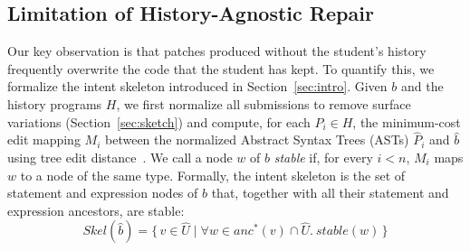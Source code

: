\documentclass[10pt,conference]{IEEEtran}
\begin{document}
\subsection{Limitation of History-Agnostic Repair}\label{sec:prelim-limit}

Our key observation is that patches produced without the student's history frequently overwrite the code that the student has kept. To quantify this, we formalize the intent skeleton introduced in Section~\ref{sec:intro}. Given $b$ and the history programs $H$, we first normalize all submissions to remove surface variations (Section~\ref{sec:sketch}) and compute, for each $P_i \in H$, the minimum-cost edit mapping $M_i$ between the normalized Abstract Syntax Trees (ASTs) $\hat{P}_i$ and $\hat{b}$ using tree edit distance~\cite{bille2005survey, pawlik2016tree}. We call a node $w$ of $\hat{b}$ \emph{stable} if, for every $i < n$, $M_i$ maps $w$ to a node of the same type. Formally, the intent skeleton is the set of statement and expression nodes of $\hat{b}$ that, together with all their statement and expression ancestors, are stable:
\[ \mathit{Skel}(\hat{b}) = \{\, v \in \hat{U} \mid \forall w \in \mathit{anc}^{*}(v) \cap \hat{U}.\ \mathit{stable}(w) \,\} \]
\end{document}
